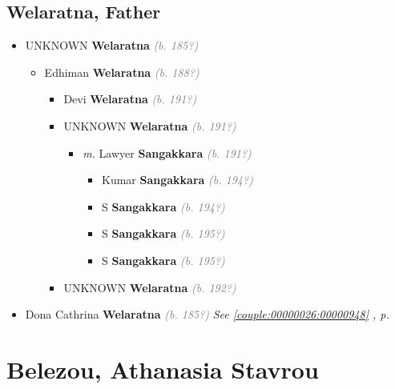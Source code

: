 \documentclass[10pt, openany]{book}
\begin{document}
\chapter{Welaratna, Father}
\label{00000950}
\textcolor{slmaroon}{\textit{}}
\begin{itemize}
\item{UNKNOWN \textbf{Welaratna} \textcolor{gray}{\textit{(b. 185?)}}
\begin{itemize}
\item{Edhiman \textbf{Welaratna} \textcolor{gray}{\textit{(b. 188?)}}
\begin{itemize}
\item{Devi \textbf{Welaratna} \textcolor{gray}{\textit{(b. 191?)}}
 }
\item{UNKNOWN \textbf{Welaratna} \textcolor{gray}{\textit{(b. 191?)}}
\begin{itemize}
\item{\textit{m.} Lawyer \textbf{Sangakkara} \textcolor{gray}{\textit{(b. 191?)}}   \label{couple:00000694:00000946} \begin{itemize}
\item{Kumar \textbf{Sangakkara} \textcolor{gray}{\textit{(b. 194?)}}
 }
\item{S \textbf{Sangakkara} \textcolor{gray}{\textit{(b. 194?)}}
 }
\item{S \textbf{Sangakkara} \textcolor{gray}{\textit{(b. 195?)}}
 }
\item{S \textbf{Sangakkara} \textcolor{gray}{\textit{(b. 195?)}}
 }
\end{itemize}}
\end{itemize}
 }
\item{UNKNOWN \textbf{Welaratna} \textcolor{gray}{\textit{(b. 192?)}}
 }
\end{itemize}
 }
\end{itemize}
 }
\item{Dona Cathrina \textbf{Welaratna} \textcolor{gray}{\textit{(b. 185?)}} \textcolor{slteal}{\textit{See  \autoref{couple:00000026:00000948} \textit{, p. \pageref{couple:00000026:00000948} }}}}
\end{itemize}
 
\part{Belezou, Athanasia Stavrou}
\end{document}
